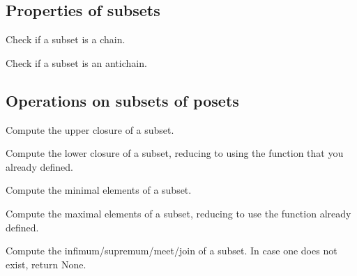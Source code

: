 \subsection{Properties of subsets}


\begin{exercise}
  Check if a subset is a chain.
\end{exercise}

\begin{exercise}
  Check if a subset is an antichain.
\end{exercise}

\subsection{Operations on subsets of posets}

\begin{exercise}
  Compute the upper closure of a subset.

\end{exercise}


\begin{exercise}
  Compute the lower closure of a subset, reducing to
  using the function  that you
  already defined.

\end{exercise}



\begin{exercise}
  Compute the minimal elements of a subset.


\end{exercise}


\begin{exercise}
  Compute the maximal elements of a subset, reducing
  to use the function  already defined.


\end{exercise}


\begin{exercise}
  Compute the infimum/supremum/meet/join of a subset.
  In case one does not exist, return None.


\end{exercise}

